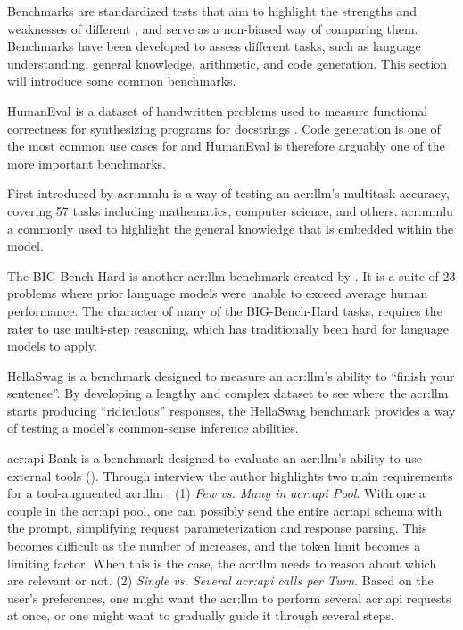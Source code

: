 Benchmarks are standardized tests that aim to highlight the strengths and weaknesses of different , and serve as a non-biased way of comparing them. Benchmarks have been developed to assess different tasks, such as language understanding, general knowledge, arithmetic, and code generation. This section will introduce some common benchmarks.

HumanEval is a dataset of handwritten problems used to measure functional correctness for synthesizing programs for docstrings \citep[2-4]{chenEvaluatingLargeLanguage2021}. Code generation is one of the most common use cases for  and HumanEval is therefore arguably one of the more important benchmarks.

First introduced by \cite{hendrycksMeasuringMassiveMultitask2021} \gls{acr:mmlu} is a way of testing an \acrlong{acr:llm}'s multitask accuracy, covering 57 tasks including mathematics, computer science, and others. \gls{acr:mmlu} a commonly used to highlight the general knowledge that is embedded within the model.

The BIG-Bench-Hard is another \acrshort{acr:llm} benchmark created by \cite{suzgunChallengingBIGBenchTasks2022}. It is a suite of 23 problems where prior language models were unable to exceed average human performance. The character of many of the BIG-Bench-Hard tasks, requires the rater to use multi-step reasoning, which has traditionally been hard for language models to apply.

HellaSwag \citep{zellersHellaSwagCanMachine2019} is a benchmark designed to measure an \acrshort{acr:llm}'s ability to \enquote{finish your sentence}. By developing a lengthy and complex dataset to see where the \acrshort{acr:llm} starts producing \enquote{ridiculous} responses, the HellaSwag benchmark provides a way of testing a model's common-sense inference abilities.

\acrshort{acr:api}-Bank \citep{liAPIBankComprehensiveBenchmark2023} is a benchmark designed to evaluate an \acrshort{acr:llm}'s ability to use external tools (). Through interview the author highlights two main requirements for a tool-augmented \acrshort{acr:llm} \citep[2]{liAPIBankComprehensiveBenchmark2023}. (1) \textit{Few vs. Many  in \acrshort{acr:api} Pool}. With one a couple  in the \acrshort{acr:api} pool, one can possibly send the entire \acrshort{acr:api} schema with the prompt, simplifying request parameterization and response parsing. This becomes difficult as the number of  increases, and the token limit becomes a limiting factor. When this is the case, the \acrshort{acr:llm} needs to reason about which  are relevant or not. (2) \textit{Single vs. Several \acrshort{acr:api} calls per Turn}. Based on the user's preferences, one might want the \acrshort{acr:llm} to perform several \acrshort{acr:api} requests at once, or one might want to gradually guide it through several steps.



\glsresetall